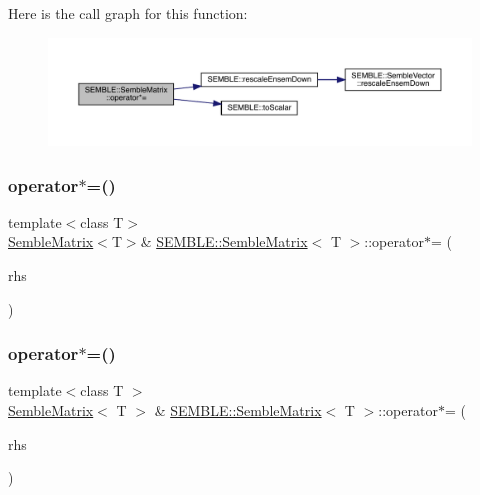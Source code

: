 Here is the call graph for this function\+:
\nopagebreak
\begin{figure}[H]
\begin{center}
\leavevmode
\includegraphics[width=350pt]{df/d87/structSEMBLE_1_1SembleMatrix_a0170ab204b392638e23a215fe9943cd5_cgraph}
\end{center}
\end{figure}
\mbox{\label{structSEMBLE_1_1SembleMatrix_a174956301b0911918f9ea9e1fde610dd}} 
\subsubsection{\texorpdfstring{operator$\ast$=()}{operator*=()}\hspace{0.1cm}{\footnotesize\ttfamily [6/10]}}
{\footnotesize\ttfamily template$<$class T$>$ \\
\mbox{\hyperlink{structSEMBLE_1_1SembleMatrix}{Semble\+Matrix}}$<$T$>$\& \mbox{\hyperlink{structSEMBLE_1_1SembleMatrix}{S\+E\+M\+B\+L\+E\+::\+Semble\+Matrix}}$<$ T $>$\+::operator$\ast$= (\begin{DoxyParamCaption}\item[{const typename \mbox{\hyperlink{structSEMBLE_1_1PromoteEnsem}{Promote\+Ensem}}$<$ T $>$\+::Type \&}]{rhs }\end{DoxyParamCaption})}

\mbox{\label{structSEMBLE_1_1SembleMatrix_aa96c5b6adbf7c2a69d602d68d7abc863}} 
\subsubsection{\texorpdfstring{operator$\ast$=()}{operator*=()}\hspace{0.1cm}{\footnotesize\ttfamily [7/10]}}
{\footnotesize\ttfamily template$<$class T $>$ \\
\mbox{\hyperlink{structSEMBLE_1_1SembleMatrix}{Semble\+Matrix}}$<$ T $>$ \& \mbox{\hyperlink{structSEMBLE_1_1SembleMatrix}{S\+E\+M\+B\+L\+E\+::\+Semble\+Matrix}}$<$ T $>$\+::operator$\ast$= (\begin{DoxyParamCaption}\item[{const \mbox{\hyperlink{structSEMBLE_1_1SembleMatrix}{Semble\+Matrix}}$<$ T $>$ \&}]{rhs }\end{DoxyParamCaption})}

